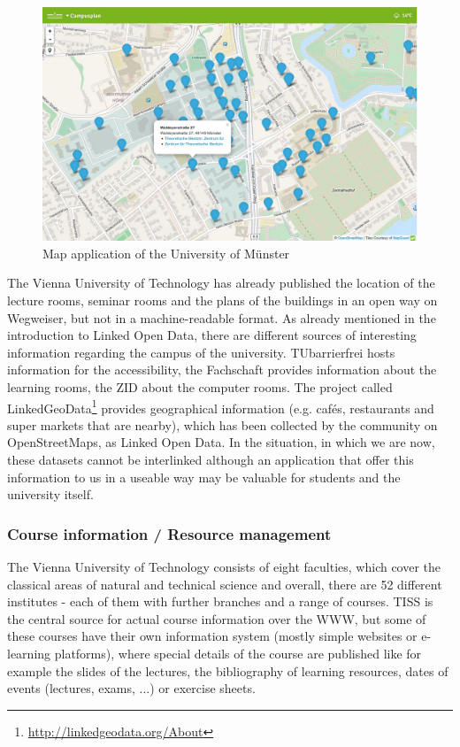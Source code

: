 \documentclass{article}
\begin{document}
\begin{figure}[t]
\centering \includegraphics*[width=1.0\columnwidth]{images/maps-app/lodum_muenster_map_app.png}
\caption{Map application of the University of Münster}
\label{fig:um-map-app}
\end{figure}

The Vienna University of Technology has already published the location of the lecture rooms, seminar rooms and the plans of the buildings in an open way on Wegweiser, but not in a machine-readable format. As already mentioned in the introduction to Linked Open Data, there are different sources of interesting information regarding the campus of the university. TUbarrierfrei hosts information for the accessibility, the Fachschaft provides information about the learning rooms, the ZID about the computer rooms. The project called LinkedGeoData\footnote{\url{http://linkedgeodata.org/About}} provides geographical information (e.g. cafés, restaurants and super markets that are nearby), which has been collected by the community on OpenStreetMaps, as Linked Open Data. In the situation, in which we are now, these datasets cannot be interlinked although an application that offer this information to us in a useable way may be valuable for students and the university itself.

\subsubsection{Course information / Resource management}
\label{questionaire:usecase-course-rml}
The Vienna University of Technology consists of eight faculties, which cover the classical areas of natural and technical science and overall, there are 52 different institutes - each of them with further branches and a range of courses. TISS is the central source for actual course information over the WWW, but some of these courses have their own information system (mostly simple websites or e-learning platforms), where special details of the course are published like for example the slides of the lectures, the bibliography of learning resources, dates of events (lectures, exams, ...) or exercise sheets.
\end{document}
